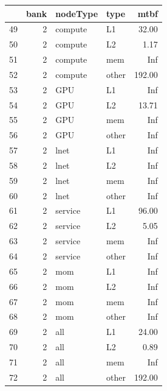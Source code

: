 \begin{t able}[t]
\begin{table}[t]
\centering
\begin{tabular}{rrllr}
  \hline
 & bank & nodeType & type & mtbf \\ 
  \hline
  49 &   2 & compute & L1 & 32.00 \\ 
  50 &   2 & compute & L2 & 1.17 \\ 
  51 &   2 & compute & mem & Inf \\ 
  52 &   2 & compute & other & 192.00 \\ 
  53 &   2 & GPU & L1 & Inf \\ 
  54 &   2 & GPU & L2 & 13.71 \\ 
  55 &   2 & GPU & mem & Inf \\ 
  56 &   2 & GPU & other & Inf \\ 
  57 &   2 & lnet & L1 & Inf \\ 
  58 &   2 & lnet & L2 & Inf \\ 
  59 &   2 & lnet & mem & Inf \\ 
  60 &   2 & lnet & other & Inf \\ 
  61 &   2 & service & L1 & 96.00 \\ 
  62 &   2 & service & L2 & 5.05 \\ 
  63 &   2 & service & mem & Inf \\ 
  64 &   2 & service & other & Inf \\ 
  65 &   2 & mom & L1 & Inf \\ 
  66 &   2 & mom & L2 & Inf \\ 
  67 &   2 & mom & mem & Inf \\ 
  68 &   2 & mom & other & Inf \\ 
  69 &   2 & all & L1 & 24.00 \\ 
  70 &   2 & all & L2 & 0.89 \\ 
  71 &   2 & all & mem & Inf \\ 
  72 &   2 & all & other & 192.00 \\

   \hline
\end{tabular}
\end{table}


\end{t able}
